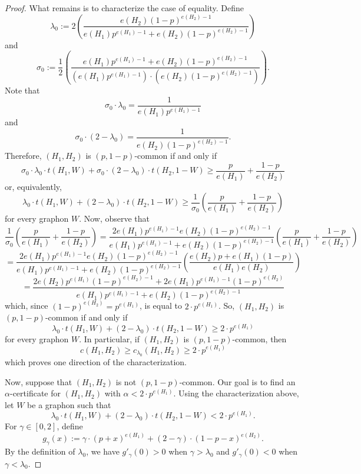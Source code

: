 \documentclass[10pt,a4paper]{amsart}
\begin{document}
\begin{proof}
What remains is to characterize the case of equality. Define
\begin{equation}\label{eq:commonlambda}\lambda_0 :=2\left( \frac{e(H_2)(1-p)^{e(H_2)-1}}{e(H_1)p^{e(H_1)-1} + e(H_2)(1-p)^{e(H_2)-1}}\right)\end{equation}
and
\begin{equation}\label{eq:commonsigma}\sigma_0 := \frac{1}{2}\left(\frac{e(H_1)p^{e(H_1)-1} + e(H_2)(1-p)^{e(H_2)-1}}{\left(e(H_1)p^{e(H_1)-1}\right)\cdot\left(e(H_2)(1-p)^{e(H_2)-1}\right)}\right).\end{equation}
Note that
\begin{equation}\label{eq:lambdasigma1}\sigma_0\cdot\lambda_0 = \frac{1}{e(H_1)p^{e(H_1)-1}}\end{equation}
and
\begin{equation}\label{eq:lambdasigma2}\sigma_0\cdot(2-\lambda_0) = \frac{1}{e(H_2)(1-p)^{e(H_2)-1}}.\end{equation}
Therefore, $(H_1,H_2)$ is $(p,1-p)$-common if and only if 
\[\sigma_0\cdot\lambda_0\cdot t(H_1,W) + \sigma_0\cdot(2-\lambda_0)\cdot t(H_2,1-W)\geq \frac{p}{e(H_1)}+\frac{1-p}{e(H_2)}\]
or, equivalently, 
\[\lambda_0\cdot t(H_1,W) + (2-\lambda_0)\cdot t(H_2,1-W)\geq \frac{1}{\sigma_0}\left(\frac{p}{e(H_1)}+\frac{1-p}{e(H_2)}\right)\]
for every graphon $W$. Now, observe that 
\[\frac{1}{\sigma_0}\left(\frac{p}{e(H_1)}+\frac{1-p}{e(H_2)}\right) = \frac{2e(H_1)p^{e(H_1)-1}e(H_2)(1-p)^{e(H_2)-1}}{e(H_1)p^{e(H_1)-1} + e(H_2)(1-p)^{e(H_2)-1}}\left(\frac{p}{e(H_1)}+\frac{1-p}{e(H_2)}\right)\]
\[ = \frac{2e(H_1)p^{e(H_1)-1}e(H_2)(1-p)^{e(H_2)-1}}{e(H_1)p^{e(H_1)-1} + e(H_2)(1-p)^{e(H_2)-1}}\left(\frac{e(H_2)p+e(H_1)(1-p)}{e(H_1)e(H_2)}\right)\]
\[ = \frac{2e(H_2)p^{e(H_1)}(1-p)^{e(H_2)-1}+2e(H_1)p^{e(H_1)-1}(1-p)^{e(H_2)}}{e(H_1)p^{e(H_1)-1} + e(H_2)(1-p)^{e(H_2)-1}}\]
which, since $(1-p)^{e(H_2)}=p^{e(H_1)}$, is equal to $2\cdot p^{e(H_1)}$. So, $(H_1,H_2)$ is $(p,1-p)$-common if and only if 
\[\lambda_0\cdot t(H_1,W) + (2-\lambda_0)\cdot t(H_2,1-W)\geq2\cdot p^{e(H_1)}\]
for every graphon $W$. In particular, if $(H_1,H_2)$ is $(p,1-p)$-common, then
\[c(H_1,H_2)\geq c_{\lambda_0}(H_1,H_2)\geq 2\cdot p^{e(H_1)}\]
which proves one direction of the characterization. 

Now, suppose that $(H_1,H_2)$ is not $(p,1-p)$-common. Our goal is to find an $\alpha$-certificate for $(H_1,H_2)$ with $\alpha<2\cdot p^{e(H_1)}$. Using the characterization above, let $W$ be a graphon such that
\[
\lambda_0\cdot t(H_1,W)+(2-\lambda_0)\cdot t(H_2,1-W)<2\cdot p^{e(H_1)}.
\]
For $\gamma\in[0,2]$, define
\[
g_\gamma(x):=\gamma\cdot (p+x)^{e(H_1)}+(2-\gamma)\cdot(1-p-x)^{e(H_2)}.
\]
By the definition of $\lambda_0$, we have $g'_\gamma(0)>0$ when $\gamma>\lambda_0$ and $g'_\gamma(0)<0$ when $\gamma<\lambda_0$.


\end{proof}
\end{document}
